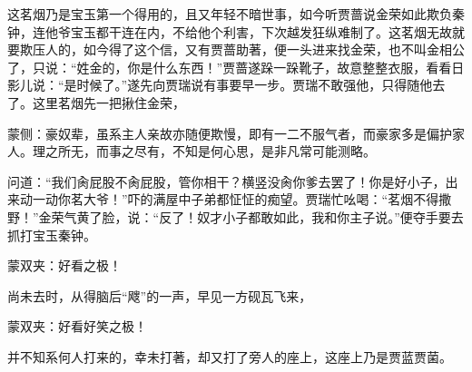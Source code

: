 \begin{parag}
    这茗烟乃是宝玉第一个得用的，且又年轻不暗世事，如今听贾蔷说金荣如此欺负秦钟，连他爷宝玉都干连在内，不给他个利害，下次越发狂纵难制了。这茗烟无故就要欺压人的，如今得了这个信，又有贾蔷助著，便一头进来找金荣，也不叫金相公了，只说：“姓金的，你是什么东西！”贾蔷遂跺一跺靴子，故意整整衣服，看看日影儿说：“是时候了。”遂先向贾瑞说有事要早一步。贾瑞不敢强他，只得随他去了。这里茗烟先一把揪住金荣，\begin{note}蒙侧：豪奴辈，虽系主人亲故亦随便欺慢，即有一二不服气者，而豪家多是偏护家人。理之所无，而事之尽有，不知是何心思，是非凡常可能测略。\end{note}问道：“我们肏屁股不肏屁股，管你相干？横竖没肏你爹去罢了！你是好小子，出来动一动你茗大爷！”吓的满屋中子弟都怔怔的痴望。贾瑞忙吆喝：“茗烟不得撒野！”金荣气黄了脸，说：“反了！奴才小子都敢如此，我和你主子说。”便夺手要去抓打宝玉秦钟。\begin{note}蒙双夹：好看之极！\end{note}尚未去时，从得脑后“飕”的一声，早见一方砚瓦飞来，\begin{note}蒙双夹：好看好笑之极！\end{note}并不知系何人打来的，幸未打著，却又打了旁人的座上，这座上乃是贾蓝贾菌。
\end{parag}



